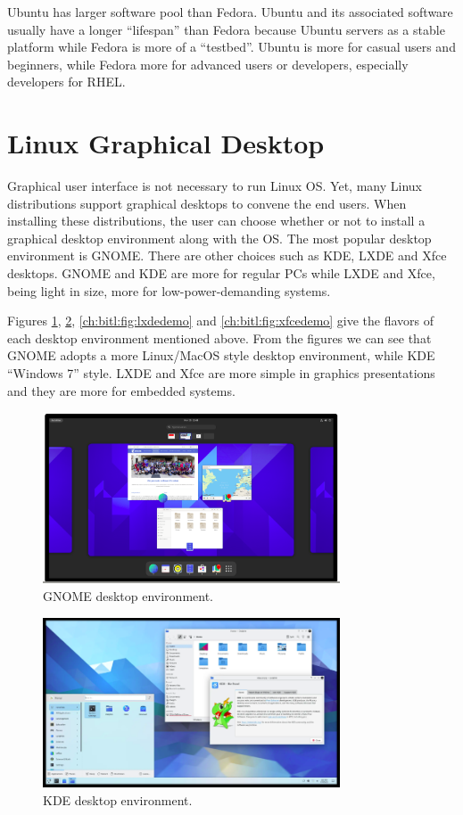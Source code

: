Ubuntu has larger software pool than Fedora. Ubuntu and its associated software usually have a longer ``lifespan'' than Fedora because Ubuntu servers as a stable platform while Fedora is more of a ``testbed''. Ubuntu is more for casual users and beginners, while Fedora more for advanced users or developers, especially developers for RHEL.

\section{Linux Graphical Desktop}

Graphical user interface is not necessary to run Linux OS. Yet, many Linux distributions support graphical desktops to convene the end users. When installing these distributions, the user can choose whether or not to install a graphical desktop environment along with the OS. The most popular desktop environment is GNOME. There are other choices such as KDE, LXDE and Xfce desktops. GNOME and KDE are more for regular PCs while LXDE and Xfce, being light in size, more for low-power-demanding systems.

Figures \ref{ch:bitl:fig:gnomedemo}, \ref{ch:bitl:fig:kdedemo}, \ref{ch:bitl:fig:lxdedemo} and \ref{ch:bitl:fig:xfcedemo} give the flavors of each desktop environment mentioned above. From the figures we can see that GNOME adopts a more Linux/MacOS style desktop environment, while KDE ``Windows 7'' style. LXDE and Xfce are more simple in graphics presentations and they are more for embedded systems.

\begin{figure}[htbp]
	\centering
	\includegraphics[width=250pt]{chapters/part-1/figures/gnome_demo.png}
	\caption{GNOME desktop environment.} \label{ch:bitl:fig:gnomedemo}
\end{figure}

\begin{figure}[htbp]
	\centering
	\includegraphics[width=250pt]{chapters/part-1/figures/kde_demo.png}
	\caption{KDE desktop environment.} \label{ch:bitl:fig:kdedemo}
\end{figure}

